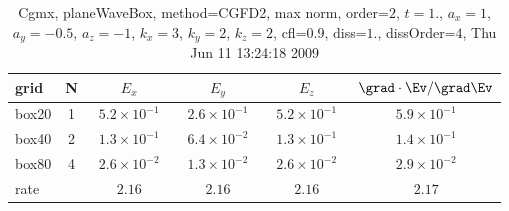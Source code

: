 \begin{table}[hbt]\tableFont %
\begin{center}
\begin{tabular}{|l|c|c|c|c|c|} \hline 
grid  & N &  $E_x$ &  $E_y$ & $E_z$ & $\grad\cdot\Ev/\grad\Ev$\\ \hline 
               box20 &     1 & ~$5.2\times10^{ -1}$~ & ~$2.6\times10^{ -1}$~ & ~$5.2\times10^{ -1}$~ & ~$5.9\times10^{ -1}$~  \\ \hline
               box40 &     2 & ~$1.3\times10^{ -1}$~ & ~$6.4\times10^{ -2}$~ & ~$1.3\times10^{ -1}$~ & ~$1.4\times10^{ -1}$~  \\ \hline
               box80 &     4 & ~$2.6\times10^{ -2}$~ & ~$1.3\times10^{ -2}$~ & ~$2.6\times10^{ -2}$~ & ~$2.9\times10^{ -2}$~  \\ \hline
    rate             &       &       $2.16$          &       $2.16$          &       $2.16$          &       $2.17$           \\ \hline
\end{tabular}
\caption{Cgmx, planeWaveBox, method=CGFD2, max norm, order=$2$, $t=1.$, $a_x=1$,  $a_y=-0.5$, $a_z=-1$,  $k_x=3$,  $k_y=2$, $k_z=2$, cfl=$0.9$, diss=$1.$, dissOrder=$4$, Thu Jun 11 13:24:18 2009}\label{table:planeWaveBoxNFDTDOrder2max}
\end{center}
\end{table}
